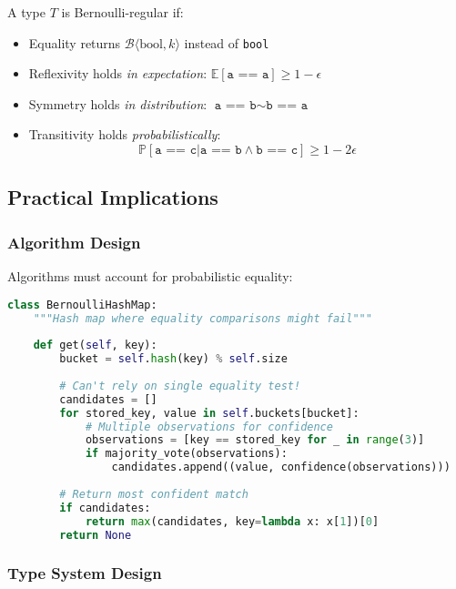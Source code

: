 \begin{definition}
A type $T$ is Bernoulli-regular if:
\begin{itemize}
\item Equality returns $\mathcal{B}\langle\text{bool}, k\rangle$ instead of \texttt{bool}
\item Reflexivity holds \textit{in expectation}: $\mathbb{E}[\texttt{a == a}] \geq 1 - \epsilon$
\item Symmetry holds \textit{in distribution}: $\texttt{a == b} \sim \texttt{b == a}$
\item Transitivity holds \textit{probabilistically}: 
\begin{equation}
\mathbb{P}[\texttt{a == c} | \texttt{a == b} \land \texttt{b == c}] \geq 1 - 2\epsilon
\end{equation}
\end{itemize}
\end{definition}

\subsection{Practical Implications}

\subsubsection{Algorithm Design}

Algorithms must account for probabilistic equality:

\begin{lstlisting}[language=Python, caption={Hash table with Bernoulli equality}]
class BernoulliHashMap:
    """Hash map where equality comparisons might fail"""
    
    def get(self, key):
        bucket = self.hash(key) % self.size
        
        # Can't rely on single equality test!
        candidates = []
        for stored_key, value in self.buckets[bucket]:
            # Multiple observations for confidence
            observations = [key == stored_key for _ in range(3)]
            if majority_vote(observations):
                candidates.append((value, confidence(observations)))
        
        # Return most confident match
        if candidates:
            return max(candidates, key=lambda x: x[1])[0]
        return None
\end{lstlisting}

\subsubsection{Type System Design}

